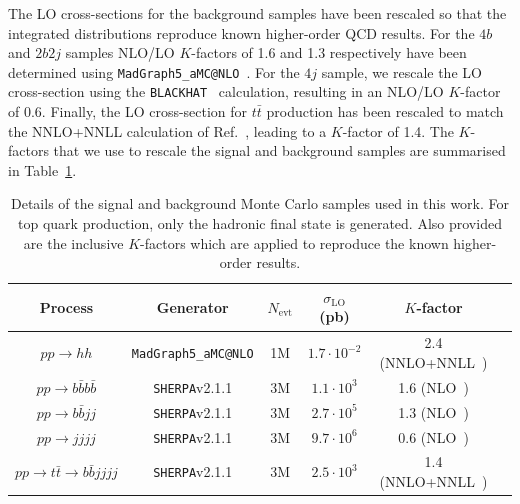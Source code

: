 The LO cross-sections for
the background samples have been rescaled so that the integrated
distributions reproduce known higher-order QCD results.
%
For the $4b$ and $2b2j$ samples NLO/LO $K$-factors of 1.6 and 1.3
respectively have been determined
using {\tt MadGraph5\_aMC@NLO}~\cite{Alwall:2014hca}.
%
For the $4j$ sample, we rescale the LO cross-section
using the {\tt BLACKHAT}~\cite{Bern:2011ep}
calculation, resulting in
an NLO/LO $K$-factor of 0.6.
%
Finally, the LO cross-section for $t\bar{t}$ production has been rescaled
to match the NNLO+NNLL calculation of Ref.~\cite{Czakon:2013goa}, leading
to a $K$-factor of 1.4.
%
The $K$-factors that we use to rescale
the signal and background samples are summarised in
Table~\ref{tab:samples}.


\begin{table}[h]
  \small
\begin{center}
\begin{tabular}{|c|c|c|c|c|c|}
\hline
Process &  Generator & $N_{\mathrm{evt}}$ & $\sigma_{\mathrm{LO}}$ (pb)  & $K$-factor \\
\hline
\hline
$pp \to hh$ &  {\tt MadGraph5\_aMC@NLO} & 1M & $1.7\cdot10^{-2}$  &  2.4  (NNLO+NNLL~\cite{deFlorian:2013jea,deFlorian:2015moa}) \\
\hline
\hline
$pp \to b\bar{b}b\bar{b}$ &  {\tt SHERPA}v2.1.1 & 3M &$1.1 \cdot10^3$  & 1.6 (NLO~\cite{Alwall:2014hca}) \\
$pp \to b\bar{b}jj$ &  {\tt SHERPA}v2.1.1 & 3M & $2.7 \cdot 10^5$ & 1.3 (NLO~\cite{Alwall:2014hca}) \\
$pp \to jjjj$ &  {\tt SHERPA}v2.1.1 & 3M  & $9.7\cdot 10^6$ &  0.6 (NLO~\cite{Bern:2011ep})\\
$pp \to t\bar{t}\to b\bar{b}jjjj$ &  {\tt SHERPA}v2.1.1 & 3M & $2.5\cdot 10^3$   & 1.4 (NNLO+NNLL~\cite{Czakon:2013goa})\\
\hline
\end{tabular}
\caption{\small Details of the signal and background Monte
  Carlo samples used in this work.
  For top quark production, only the hadronic final state is generated.
  Also provided are the inclusive $K$-factors
  which are applied to reproduce the known
  higher-order results. \label{tab:samples}
} 
\end{center}
\end{table}%


